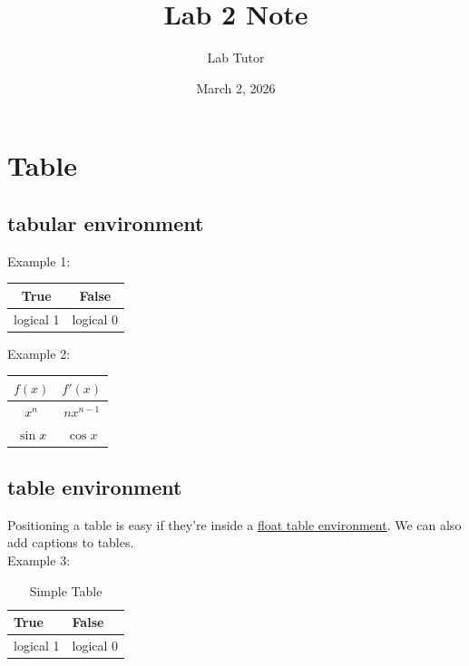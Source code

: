 \documentclass[12pt]{article}
\title{Lab 2 Note}
\author{Lab Tutor}
\date{March 2, 2026}
\begin{document}
\maketitle

\tableofcontents

\vskip 2cm 

\listoftables
\listoffigures

\newpage



\section{Table}
\subsection{tabular environment}

Example 1:\\
\begin{tabular}{|c|c|}
	\hline
	True & False \\
	\hline
	logical 1 & logical 0 \\
	\hline
\end{tabular}

\vspace{5mm}

\noindent Example 2:\\
\begin{center}
\begin{tabular}{c|c}
	$f(x)$ & $f'(x)$ \\
	\hline
	$x^{n}$ & $nx^{n-1}$ \\
	$\sin x$ & $\cos x$
\end{tabular}
\end{center}

\subsection{table environment}
Positioning a table is easy if they're inside a \underline{float table environment}. We can also add captions to tables.\\

\noindent Example 3:\\
\begin{table}[h]
	\centering
	\begin{tabular}{|l|l|}
		\hline
		True & False \\
		\hline
		logical 1 & logical 0 \\
		\hline
	\end{tabular}
	\caption{Simple Table}
\end{table}
\end{document}

